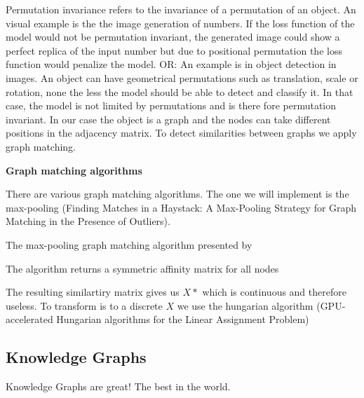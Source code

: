 
Permutation invariance refers to the invariance of a permutation of an object. An visual example is the the image generation of numbers. If the loss function of the model would not be permutation invariant, the generated image could show a perfect replica of the input number but due to positional permutation the loss function would penalize the model. 
OR: An example is in object detection in images. An object can have geometrical permutations such as translation, scale or rotation, none the less the model should be able to detect and classify it. In that case, the model is not limited by permutations and  is there fore permutation invariant.
In our case the object is a graph and the nodes can take different positions in the adjacency matrix. To detect similarities between graphs we apply graph matching.

\textbf{Graph matching algorithms}

There are various graph matching algorithms. The one we will implement is the max-pooling (Finding Matches in a Haystack: A Max-Pooling Strategy for Graph Matching in the Presence of Outliers). 

The max-pooling graph matching algorithm presented by

The algorithm returns a symmetric affinity matrix for all nodes

The resulting similartiry matrix gives us $X*$ which is continuous and therefore useless. To transform is to a discrete $X$ we use the hungarian algorithm (GPU-accelerated Hungarian algorithms for the Linear
Assignment Problem)



\subsection{Knowledge Graphs}

Knowledge Graphs are great! The best in the world.
